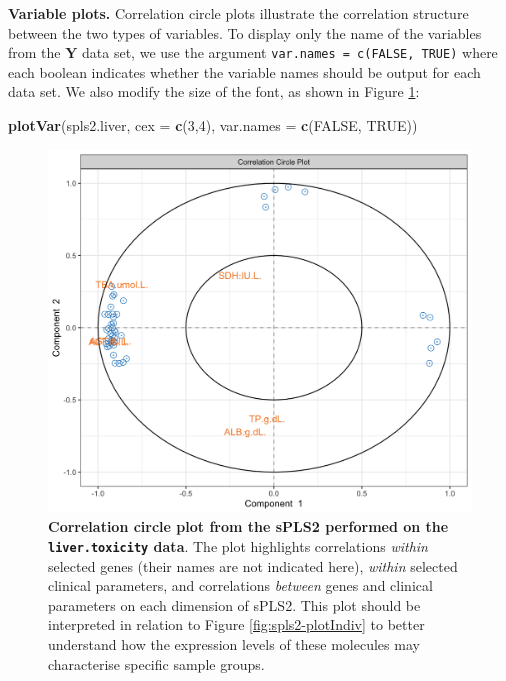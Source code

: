 \documentclass[]{book}
\newenvironment{Shaded}{\begin{snugshade}}{\end{snugshade}}
\newcommand{\KeywordTok}[1]{\textcolor[rgb]{0.13,0.29,0.53}{\textbf{#1}}}
\newcommand{\DataTypeTok}[1]{\textcolor[rgb]{0.13,0.29,0.53}{#1}}
\newcommand{\DecValTok}[1]{\textcolor[rgb]{0.00,0.00,0.81}{#1}}
\newcommand{\OtherTok}[1]{\textcolor[rgb]{0.56,0.35,0.01}{#1}}
\newcommand{\NormalTok}[1]{#1}
\begin{document}
\textbf{Variable plots.} Correlation circle plots illustrate the
correlation structure between the two types of variables. To display
only the name of the variables from the \(\boldsymbol{Y}\) data set, we
use the argument \texttt{var.names\ =\ c(FALSE,\ TRUE)} where each
boolean indicates whether the variable names should be output for each
data set. We also modify the size of the font, as shown in Figure
\ref{fig:spls2-plotVar}:

\begin{Shaded}
\begin{Highlighting}[]
\KeywordTok{plotVar}\NormalTok{(spls2.liver, }\DataTypeTok{cex =} \KeywordTok{c}\NormalTok{(}\DecValTok{3}\NormalTok{,}\DecValTok{4}\NormalTok{), }\DataTypeTok{var.names =} \KeywordTok{c}\NormalTok{(}\OtherTok{FALSE}\NormalTok{, }\OtherTok{TRUE}\NormalTok{))}
\end{Highlighting}
\end{Shaded}

\begin{figure}

{\centering \includegraphics[width=0.5\linewidth]{Figures/PLS/spls2-plotVar-1} 

}

\caption{\textbf{Correlation circle plot from the sPLS2
performed on the \texttt{liver.toxicity} data}. The plot highlights
correlations \emph{within} selected genes (their names are not indicated
here), \emph{within} selected clinical parameters, and correlations
\emph{between} genes and clinical parameters on each dimension of sPLS2.
This plot should be interpreted in relation to Figure
\ref{fig:spls2-plotIndiv} to better understand how the expression levels
of these molecules may characterise specific sample groups.}\label{fig:spls2-plotVar}
\end{figure}
\end{document}
